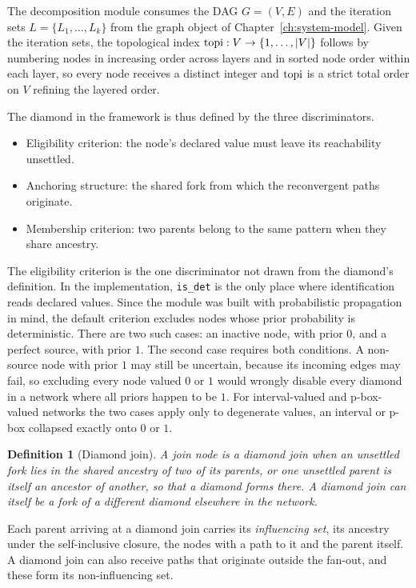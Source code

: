 \documentclass[12pt]{report}
\newtheorem{definition}[theorem]{Definition}
\begin{document}
The decomposition module consumes the DAG $G=(V,E)$ and the iteration sets $L=\{L_1,\dots,L_k\}$ from the graph object of Chapter~\ref{ch:system-model}. Given the iteration sets, the topological index $\mathrm{topi} : V \to \{1,\dots,|V|\}$ follows by numbering nodes in increasing order across layers and in sorted node order within each layer, so every node receives a distinct integer and $\mathrm{topi}$ is a strict total order on $V$ refining the layered order.

The diamond in the framework is thus defined by the three discriminators.
\begin{itemize}
\item Eligibility criterion: the node's declared value must leave its reachability unsettled.
\item Anchoring structure: the shared fork from which the reconvergent paths originate.
\item Membership criterion: two parents belong to the same pattern when they share ancestry.
\end{itemize}

The eligibility criterion is the one discriminator not drawn from the diamond's definition. In the implementation, \texttt{is\_det} is the only place where identification reads declared values. Since the module was built with probabilistic propagation in mind, the default criterion excludes nodes whose prior probability is deterministic. There are two such cases: an inactive node, with prior $0$, and a perfect source, with prior $1$. The second case requires both conditions. A non-source node with prior $1$ may still be uncertain, because its incoming edges may fail, so excluding every node valued $0$ or $1$ would wrongly disable every diamond in a network where all priors happen to be $1$. For interval-valued and p-box-valued networks the two cases apply only to degenerate values, an interval or p-box collapsed exactly onto $0$ or $1$.

\begin{definition}[Diamond join]
\label{def:djoin}
A join node is a \emph{diamond join} when an unsettled fork lies in the shared ancestry of two of its parents, or one unsettled parent is itself an ancestor of another, so that a diamond forms there. A diamond join can itself be a fork of a different diamond elsewhere in the network.
\end{definition}

Each parent arriving at a diamond join carries its \emph{influencing set}, its ancestry under the self-inclusive closure, the nodes with a path to it and the parent itself. A diamond join can also receive paths that originate outside the fan-out, and these form its non-influencing set.
\end{document}
